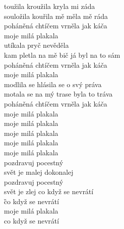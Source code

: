 
\Ami toužila kroužila kryla mi záda \\
souložila kouřila mě měla mě ráda \\
poháněná chtíčem vrněla jak káča \\
moje milá \C plakala\G  \\

\Ami utíkala pryč nevěděla\\ 
kam pletla na mě bič já byl na to sám \\
poháněná chtíčem vrněla jak káča \\
moje milá \C plakala\G  \\

\Ami modlila se hlásila se o svý práva \\
motala se na mý trase byla to tráva \\
poháněná chtíčem vrněla jak káča \\
moje milá \C plakala\G  \\

\Ami moje milá \C plakala\G  \\
\Ami moje milá \C plakala\G  \\
\Ami moje milá \C plakala\G  \\
\Ami moje milá \C plakala\G  \\
\Ami pozdravuj \C pocestný \G \\
svět je malej \Ami dokonalej\G  \\
\Ami pozdravuj \C pocestný \G \\
svět je zlej co když se \Ami nevrátí\\
\G co když se \Ami nevrátí \\
moje milá \C plakala\G  \\
co když se \Ami nevrátí 